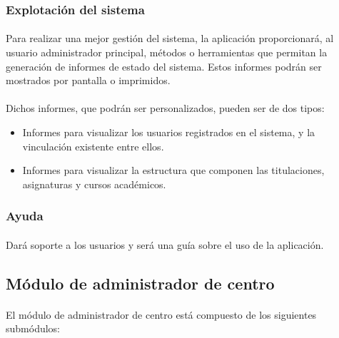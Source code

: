       \subsubsection{Explotación del sistema}

      \paragraph{}Para realizar una mejor gestión del sistema, la aplicación
      proporcionará, al usuario administrador principal, métodos o herramientas
      que permitan la generación de informes de estado del sistema. Estos
      informes podrán ser mostrados por pantalla o imprimidos.

      \paragraph{}Dichos informes, que podrán ser personalizados, pueden ser
      de dos tipos:

      \begin{itemize}
       \item Informes para visualizar los usuarios registrados en el sistema, y
             la vinculación existente entre ellos.
       \item Informes para visualizar la estructura que componen las
             titulaciones, asignaturas y cursos académicos.
      \end{itemize}

      \subsubsection{Ayuda}

      \paragraph{}Dará soporte a los usuarios y será una guía sobre el uso de
      la aplicación.

   \subsection{Módulo de administrador de centro}

      \paragraph{}El módulo de administrador de centro está compuesto de
      los siguientes submódulos:

